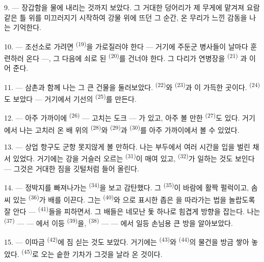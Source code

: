 9. --- 장갑함을 물에 내리는 것까지 보았다. 그 거대한 덩어리가 제 무게에 맡겨져 요람 같은
틀 위를 미끄러지기 시작하여 강물 위에 뜨던 그 순간, 온 무리가 느낀 감동을 나는 기억한다.

10. --- 조선소로 가려면  \textsuperscript{(19)}을 가로질러야 한다 — 거기에
주둔군 병사들이 날마다 훈련하러 온다 —, 그 다음에 쇠로 된 
\textsuperscript{(20)}를 건너야 한다. 그 다리가 연병장을  \textsuperscript{(21)}
과 이어 준다.

\VUsaut{3.0mm}
\VUsaut{3.0mm}

11. --- 삼촌과 함께 나는 그 큰 건물을 둘러보았다.  \textsuperscript{(22)}와
 \textsuperscript{(23)}과 이 가득한 곳이다.
 \textsuperscript{(24)}도 보았다 — 거기에서 기선의 
\textsuperscript{(25)}를 만든다.

12. --- 아주 가까이에  \textsuperscript{(26)} — 고치는 도크 — 가 있고, 아주
볼 만한  \textsuperscript{(27)}도 있다. 거기에서 나는 고치러 온 배 위의
 \textsuperscript{(28)}와  \textsuperscript{(29)}과 
\textsuperscript{(30)}를 아주 가까이에서 볼 수 있었다.

13. --- 상업 항구도 군항 못지않게 볼 만하다. 나는 부두에서 여러 시간을 입을 벌린 채
서 있었다. 거기에는 강을 거슬러 오르는  \textsuperscript{(31)}이 매여
있고,  \textsuperscript{(32)}가 일하는 것도 보인다 — 그것은
거대한 짐을 깃털처럼 들어 올린다.

\VUsaut{4.0mm}
\VUsaut{3.0mm}

14. --- 정박지를 빠져나가는  \textsuperscript{(34)}을 보고 감탄했다.
그  \textsuperscript{(35)}이 바람에 활짝 펄럭이고, 솜씨 있는 
\textsuperscript{(36)}가 배를 이끈다. 그는  \textsuperscript{(40)}와
으로 표시한 좁은 을 따라가는 법을 놀랍도록 잘 안다 —
 \textsuperscript{(41)}들을 피하면서. 그 배들은 네모난 돛 하나로 힘겹게
방향을 잡는다. 나는  \textsuperscript{(37)} —  — 에서
이등  \textsuperscript{(39)}을,  \textsuperscript{(38)} —
 — 에서 일등 손님용 큰 방을 알아보았다.

15. --- 이따금  \textsuperscript{(42)}에 짐 싣는 것도 보았다. 거기에는
 \textsuperscript{(43)}와  \textsuperscript{(44)}의 물건을
방금 쌓아 놓았다.  \textsuperscript{(45)}로 오는 숱한 기차가 그것을
날라 온 것이다.

